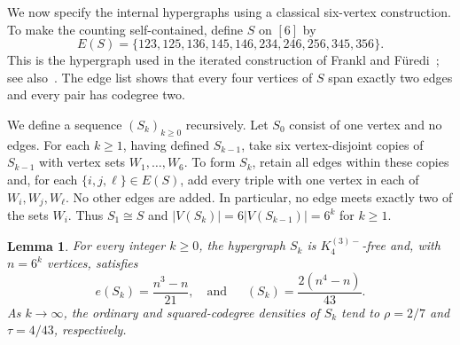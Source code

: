 \documentclass[11pt]{article}
\newtheorem{lemma}[theorem]{Lemma}
\theoremstyle{remark}
\numberwithin{equation}{section}
\DeclareMathOperator{\co}{co_2}
\newcommand{\Km}{K_4^{(3)-}}
\begin{document}
We now specify the internal hypergraphs using a classical six-vertex
construction. To make the counting self-contained, define $S$ on $[6]$ by
\begin{equation*}
 E(S)=\{123,125,136,145,146,234,246,256,345,356\}.
\end{equation*}
This is the hypergraph used in the iterated construction of
Frankl and F\"uredi~\cite{FF}; see also~\cite[Section~3.9]{BCL}.
The edge list shows that every four vertices of $S$ span exactly two
edges and every pair has codegree two.

We define a sequence $(S_k)_{k\ge0}$ recursively. Let $S_0$ consist of
one vertex and no edges. For each $k\ge1$, having defined $S_{k-1}$,
take six vertex-disjoint copies of $S_{k-1}$ with vertex sets
$W_1,\ldots,W_6$. To form $S_k$, retain all edges within these copies
and, for each $\{i,j,\ell\}\in E(S)$, add every triple with one vertex
in each of $W_i,W_j,W_\ell$. No other edges are added. In particular,
no edge meets exactly two of the sets $W_i$. Thus $S_1\cong S$ and
$|V(S_k)|=6|V(S_{k-1})|=6^k$ for $k\ge1$.

\begin{lemma}\label{lem:internal}
For every integer $k\ge0$, the hypergraph $S_k$ is $\Km$-free and, with
$n=6^k$ vertices, satisfies
\begin{equation}\label{eq:internalfinite}
 e(S_k)=\frac{n^3-n}{21},\quad
 \text{and} 
 \quad
 \co(S_k)=\frac{2(n^4-n)}{43}.
\end{equation}
As $k\to\infty$, the ordinary and squared-codegree densities of $S_k$
tend to $\rho=2/7$ and $\tau=4/43$, respectively.
\end{lemma}
\end{document}
